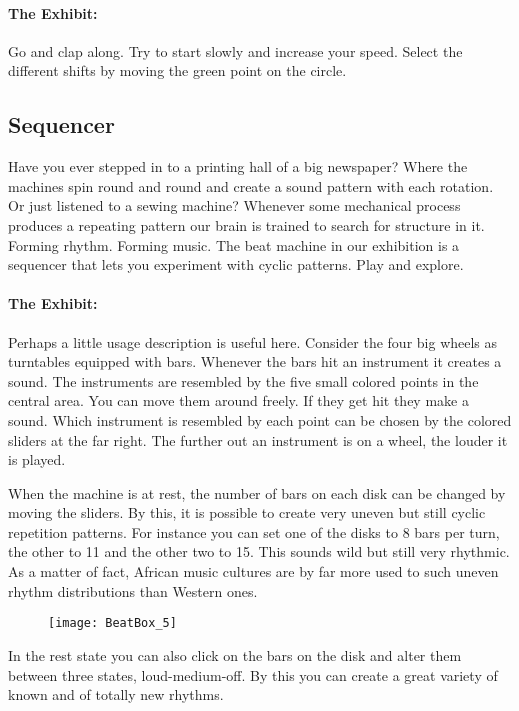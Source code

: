 \paragraph{The Exhibit:} 
Go and clap along. Try to start slowly and increase your speed. Select the different shifts by moving the green point on the circle.


\subsection{Sequencer}
Have you ever stepped in to a printing hall of a big newspaper?
Where the machines spin round and round and create a sound pattern with each rotation. Or just listened to a sewing machine? Whenever some mechanical process produces a repeating pattern our brain is trained to search for structure in it. Forming rhythm. Forming music. The beat machine in our exhibition is a sequencer that lets you experiment with cyclic patterns. Play and explore.

\paragraph{The Exhibit:}
Perhaps a little usage description is useful here. Consider the four big wheels as turntables equipped with bars. Whenever the bars hit an instrument it creates a sound. The instruments are resembled by the five small colored points in the central area. You can move them around freely. If they get hit they make a sound. Which instrument is resembled by each point can be chosen by the colored sliders at the far right. The further out an instrument is on a wheel, the louder it is played.

When the machine is at rest, the number of bars on each disk can be changed by moving the sliders. By this, it is possible to create very uneven but still cyclic repetition patterns. For instance you can set one of the disks to 8 bars per turn, the other to 11 and the other two to 15. This sounds wild but still very rhythmic. As a matter of fact, African music cultures are by far more used to such uneven rhythm distributions than Western ones.

\begin{figure}[h]
\centering
\texttt{[image: BeatBox\_5]}
\end{figure}

In the rest state you can also click on the bars on the disk and alter them between three states, loud-medium-off. By this you can create a great variety of known and of totally new rhythms.


